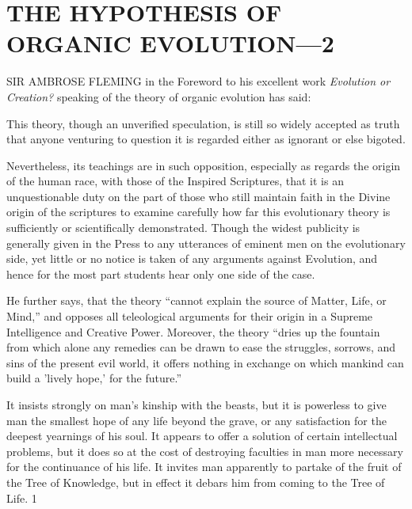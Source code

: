 \chapter{THE HYPOTHESIS OF ORGANIC EVOLUTION—2}

SIR AMBROSE FLEMING in the Foreword to his excellent work \textit{Evolution or Creation?}
speaking of the theory of organic evolution has said:

This theory, though an unverified speculation, is still so widely accepted as truth that anyone
venturing to question it is regarded either as ignorant or else bigoted.

Nevertheless, its teachings are in such opposition, especially as regards the origin of the
human race, with those of the Inspired Scriptures, that it is an unquestionable duty on the part
of those who still maintain faith in the Divine origin of the scriptures to examine carefully
how far this evolutionary theory is sufficiently or scientifically demonstrated. Though the
widest publicity is generally given in the Press to any utterances of eminent men on the
evolutionary side, yet little or no notice is taken of any arguments against Evolution, and
hence for the most part students hear only one side of the case.

He further says, that the theory ``cannot explain the source of Matter, Life, or Mind,'' and
opposes all teleological arguments for their origin in a Supreme Intelligence and Creative
Power. Moreover, the theory ``dries up the fountain from which alone any remedies can be
drawn to ease the struggles, sorrows, and sins of the present evil world, it offers nothing in
exchange on which mankind can build a 'lively hope,' for the future.''

It insists strongly on man's kinship with the beasts, but it is powerless to give man the
smallest hope of any life beyond the grave, or any satisfaction for the deepest yearnings of
his soul. It appears to offer a solution of certain intellectual problems, but it does so at the
cost of destroying faculties in man more necessary for the continuance of his life. It invites
man apparently to partake of the fruit of the Tree of Knowledge, but in effect it debars him
from coming to the Tree of Life. 1

